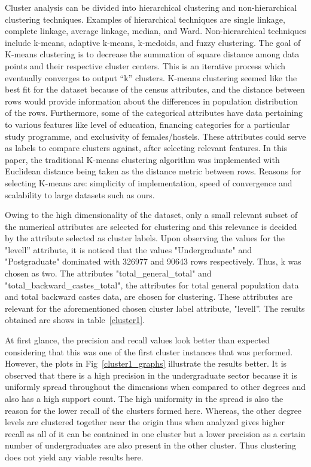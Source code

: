 Cluster analysis can be divided into hierarchical clustering and non-hierarchical clustering techniques. Examples of hierarchical techniques are single linkage, complete linkage, average linkage, median, and Ward. Non-hierarchical techniques include k-means, adaptive k-means, k-medoids, and fuzzy clustering. The goal of K-means clustering is to decrease the summation of square distance among data points and their respective cluster centers. This is an iterative process which eventually converges to output “k” clusters. K-means clustering seemed like the best fit for the dataset because of the census attributes, and the distance between rows would provide information about the differences in population distribution of the rows. Furthermore, some of the categorical attributes have data pertaining to various features like level of education, financing categories for a particular study programme, and exclusivity of females/hostels. These attributes could serve as labels to compare clusters against, after selecting relevant features. In this paper, the traditional K-means clustering algorithm was implemented with Euclidean distance being taken as the distance metric between rows. Reasons for selecting K-means are: simplicity of implementation, speed of convergence and scalability to large datasets such as ours.

Owing to the high dimensionality of the dataset, only a small relevant subset of the numerical attributes are selected for clustering and this relevance is decided by the attribute selected as cluster labels. Upon observing the values for the "levell” attribute, it is noticed that the values "Undergraduate" and "Postgraduate" dominated with 326977 and 90643 rows respectively. Thus, k was chosen as two. The attributes "total\_general\_total" and "total\_backward\_castes\_total", the attributes for total general population data and total backward castes data, are chosen for clustering. These attributes are relevant for the aforementioned chosen cluster label attribute, "levell”. The results obtained are shows in table~\ref{cluster1}. 

At first glance, the precision and recall values look better than expected considering that this was one of the first cluster instances that was performed. However, the plots in Fig~\ref{cluster1_graphs} illustrate the results better. 
It is observed that there is a high precision in the undergraduate sector because it is uniformly spread throughout the dimensions when compared to other degrees and also has a high support count. The high uniformity in the spread is also the reason for the lower recall of the clusters formed here. Whereas, the other degree levels are clustered together near the origin thus when analyzed gives higher recall as all of it can be contained in one cluster but a lower precision as a certain number of undergraduates are also present in the other cluster. Thus clustering does not yield any viable results here.


